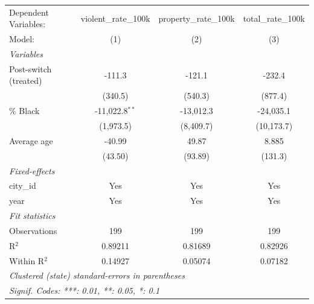 
\begingroup
\centering
\begin{tabular}{lccc}
   \tabularnewline \midrule \midrule
   Dependent Variables:  & violent\_rate\_100k   & property\_rate\_100k   & total\_rate\_100k\\    
   Model:                & (1)                   & (2)                    & (3)\\  
   \midrule
   \emph{Variables}\\
   Post-switch (treated) & -111.3                & -121.1                 & -232.4\\   
                         & (340.5)               & (540.3)                & (877.4)\\   
   \% Black              & -11,022.8$^{**}$      & -13,012.3              & -24,035.1\\   
                         & (1,973.5)             & (8,409.7)              & (10,173.7)\\   
   Average age           & -40.99                & 49.87                  & 8.885\\   
                         & (43.50)               & (93.89)                & (131.3)\\   
   \midrule
   \emph{Fixed-effects}\\
   city\_id              & Yes                   & Yes                    & Yes\\  
   year                  & Yes                   & Yes                    & Yes\\  
   \midrule
   \emph{Fit statistics}\\
   Observations          & 199                   & 199                    & 199\\  
   R$^2$                 & 0.89211               & 0.81689                & 0.82926\\  
   Within R$^2$          & 0.14927               & 0.05074                & 0.07182\\  
   \midrule \midrule
   \multicolumn{4}{l}{\emph{Clustered (state) standard-errors in parentheses}}\\
   \multicolumn{4}{l}{\emph{Signif. Codes: ***: 0.01, **: 0.05, *: 0.1}}\\
\end{tabular}
\par\endgroup


